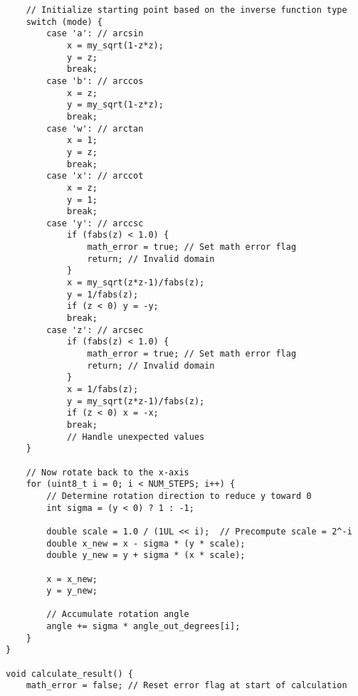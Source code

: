 \documentclass{article}
\begin{document}
\begin{verbatim}
    // Initialize starting point based on the inverse function type
    switch (mode) {  
        case 'a': // arcsin
            x = my_sqrt(1-z*z);  
            y = z;
            break;
        case 'b': // arccos
            x = z;  
            y = my_sqrt(1-z*z);
            break;
        case 'w': // arctan
            x = 1;  
            y = z;
            break;
        case 'x': // arccot
            x = z;  
            y = 1;
            break;
        case 'y': // arccsc
            if (fabs(z) < 1.0) {
                math_error = true; // Set math error flag
                return; // Invalid domain
            }
            x = my_sqrt(z*z-1)/fabs(z);  
            y = 1/fabs(z);
            if (z < 0) y = -y;
            break;
        case 'z': // arcsec
            if (fabs(z) < 1.0) {
                math_error = true; // Set math error flag
                return; // Invalid domain
            }
            x = 1/fabs(z);
            y = my_sqrt(z*z-1)/fabs(z);
            if (z < 0) x = -x;
            break;
            // Handle unexpected values
    }
    
    // Now rotate back to the x-axis
    for (uint8_t i = 0; i < NUM_STEPS; i++) {
        // Determine rotation direction to reduce y toward 0
        int sigma = (y < 0) ? 1 : -1;
        
        double scale = 1.0 / (1UL << i);  // Precompute scale = 2^-i
        double x_new = x - sigma * (y * scale);
        double y_new = y + sigma * (x * scale);
        
        x = x_new;
        y = y_new;
        
        // Accumulate rotation angle
        angle += sigma * angle_out_degrees[i];
    }
}

void calculate_result() {
    math_error = false; // Reset error flag at start of calculation
    

\end{verbatim}
\end{document}
